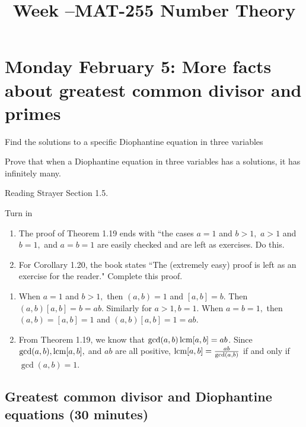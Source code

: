 \documentclass[letterpaper, 11 pt]{ximera}
\title{Week \week--MAT-255 Number Theory}
\begin{document}
\section{Monday February 5: More facts about greatest common divisor and primes}

\begin{obj}
    \item Find the solutions to a specific Diophantine equation in three variables
    \item Prove that when a Diophantine equation in three variables has a solutions, it has infinitely many.
\end{obj}

\begin{pre}
\item[Reading]  Strayer Section 1.5.

\item[Turn in] 
\begin{enumerate}
 \item  The proof of Theorem 1.19 ends with ``the cases $a=1$ and $b>1,$ $a>1$ and $b=1,$ and $a=b=1$ are easily checked and are left as exercises. Do this.
\item For Corollary 1.20, the book states ``The (extremely easy) proof is left as an exercise for the reader." Complete this proof.\end{enumerate}

\begin{solution}
 
\begin{enumerate}
 \item When $a=1$ and $b>1,$ then $(a,b)=1$ and $[a,b]=b$. Then $(a,b)[a,b]=b=ab$. Similarly for $a>1, b=1$. When $a=b=1,$ then $(a,b)=[a,b]=1$ and $(a,b)[a,b]=1=ab.$
 \item From Theorem 1.19, we know that $\gcd(a,b)\operatorname{lcm}[a,b]=ab$. Since $\gcd(a,b),\operatorname{lcm}[a,b],$ and $ab$ are all positive, $\operatorname{lcm}[a,b]=\frac{ab}{\gcd(a,b)}$ if and only if $\gcd(a,b)=1$.
\end{enumerate}
\end{solution}
\end{pre}


\subsection{Greatest common divisor and Diophantine equations (30 minutes)}
\end{document}
